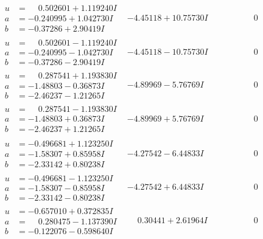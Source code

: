 \documentclass[1p]{elsarticle_modified}
\theoremstyle{definition}
\begin{document}
$$\begin{array}{c|c|c}
\begin{aligned}
u &= \phantom{-}0.502601 + 1.119240 I \\
a &= -0.240995 + 1.042730 I \\
b &= -0.37286 + 2.90419 I\end{aligned}
 & -4.45118 + 10.75730 I & \phantom{-0.000000 } 0 \\ \hline\begin{aligned}
u &= \phantom{-}0.502601 - 1.119240 I \\
a &= -0.240995 - 1.042730 I \\
b &= -0.37286 - 2.90419 I\end{aligned}
 & -4.45118 - 10.75730 I & \phantom{-0.000000 } 0 \\ \hline\begin{aligned}
u &= \phantom{-}0.287541 + 1.193830 I \\
a &= -1.48803 - 0.36873 I \\
b &= -2.46237 - 1.21265 I\end{aligned}
 & -4.89969 - 5.76769 I & \phantom{-0.000000 } 0 \\ \hline\begin{aligned}
u &= \phantom{-}0.287541 - 1.193830 I \\
a &= -1.48803 + 0.36873 I \\
b &= -2.46237 + 1.21265 I\end{aligned}
 & -4.89969 + 5.76769 I & \phantom{-0.000000 } 0 \\ \hline\begin{aligned}
u &= -0.496681 + 1.123250 I \\
a &= -1.58307 + 0.85958 I \\
b &= -2.33142 + 0.80238 I\end{aligned}
 & -4.27542 - 6.44833 I & \phantom{-0.000000 } 0 \\ \hline\begin{aligned}
u &= -0.496681 - 1.123250 I \\
a &= -1.58307 - 0.85958 I \\
b &= -2.33142 - 0.80238 I\end{aligned}
 & -4.27542 + 6.44833 I & \phantom{-0.000000 } 0 \\ \hline\begin{aligned}
u &= -0.657010 + 0.372835 I \\
a &= \phantom{-}0.280475 - 1.137390 I \\
b &= -0.122076 - 0.598640 I\end{aligned}
 & \phantom{-}0.30441 + 2.61964 I & \phantom{-0.000000 } 0\\

\end{array}$$
\end{document}
